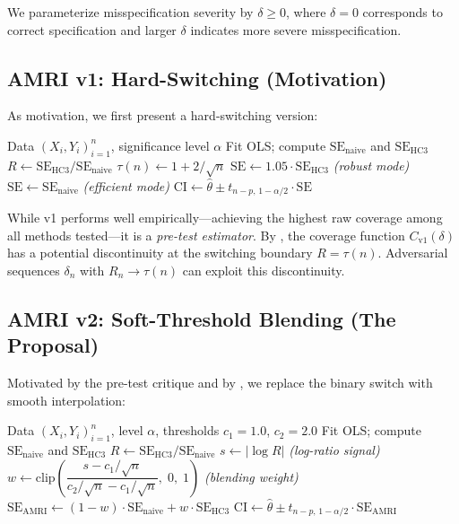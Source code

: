 \documentclass[12pt]{article}
\theoremstyle{definition}
\theoremstyle{remark}
\newcommand{\se}{\mathrm{SE}}
\newcommand{\CI}{\mathrm{CI}}
\begin{document}
We parameterize misspecification severity by $\delta \geq 0$, where $\delta = 0$ corresponds to correct specification and larger $\delta$ indicates more severe misspecification.

\subsection{AMRI v1: Hard-Switching (Motivation)}\label{sec:v1}

As motivation, we first present a hard-switching version:

\begin{algorithm}[H]
\caption{AMRI v1 (Hard-Switching)}
\label{alg:amri_v1}
\begin{algorithmic}[1]
\Require Data $(X_i, Y_i)_{i=1}^n$, significance level $\alpha$
\State Fit OLS; compute $\se_{\mathrm{naive}}$ and $\se_{\mathrm{HC3}}$
\State $R \gets \se_{\mathrm{HC3}} / \se_{\mathrm{naive}}$
\State $\tau(n) \gets 1 + 2/\sqrt{n}$
    \State $\se \gets 1.05 \cdot \se_{\mathrm{HC3}}$ \hfill\textit{(robust mode)}
\Else
    \State $\se \gets \se_{\mathrm{naive}}$ \hfill\textit{(efficient mode)}
\EndIf
\State $\CI \gets \hat\theta \pm t_{n-p,\, 1-\alpha/2} \cdot \se$
\end{algorithmic}
\end{algorithm}

While v1 performs well empirically---achieving the highest raw coverage among all methods tested---it is a \emph{pre-test estimator}. By \citet{leeb2005model}, the coverage function $C_{\mathrm{v1}}(\delta)$ has a potential discontinuity at the switching boundary $R = \tau(n)$. Adversarial sequences $\delta_n$ with $R_n \to \tau(n)$ can exploit this discontinuity.

\subsection{AMRI v2: Soft-Threshold Blending (The Proposal)}\label{sec:v2}

Motivated by the pre-test critique and by \citet{armstrong2025adapting}, we replace the binary switch with smooth interpolation:

\begin{algorithm}[H]
\caption{AMRI v2 (Soft-Threshold Blending)}
\label{alg:amri_v2}
\begin{algorithmic}[1]
\Require Data $(X_i, Y_i)_{i=1}^n$, level $\alpha$, thresholds $c_1 = 1.0$, $c_2 = 2.0$
\State Fit OLS; compute $\se_{\mathrm{naive}}$ and $\se_{\mathrm{HC3}}$
\State $R \gets \se_{\mathrm{HC3}} / \se_{\mathrm{naive}}$
\State $s \gets |\log R|$ \hfill\textit{(log-ratio signal)}
\State $w \gets \mathrm{clip}\!\left(\dfrac{s - c_1/\sqrt{n}}{c_2/\sqrt{n} - c_1/\sqrt{n}},\; 0,\; 1\right)$ \hfill\textit{(blending weight)}
\State $\se_{\mathrm{AMRI}} \gets (1 - w) \cdot \se_{\mathrm{naive}} + w \cdot \se_{\mathrm{HC3}}$
\State $\CI \gets \hat\theta \pm t_{n-p,\, 1-\alpha/2} \cdot \se_{\mathrm{AMRI}}$
\end{algorithmic}
\end{algorithm}
\end{document}
